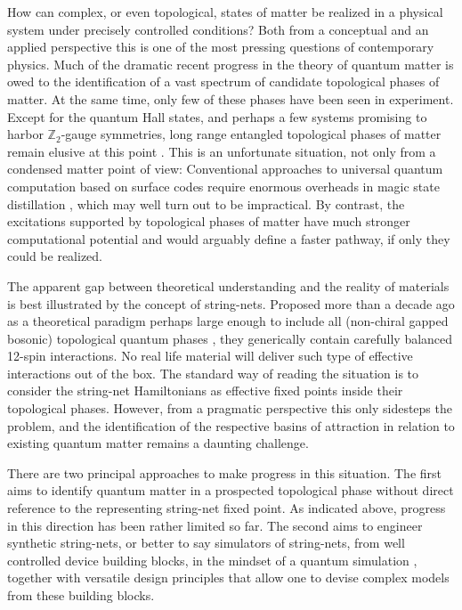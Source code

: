 \documentclass[twocolumn,floats,prx,showpacs]{revtex4-1}
\begin{document}
How can complex, or even topological, states of matter be realized in a physical system under precisely controlled conditions? Both from a conceptual and an applied perspective this is one of the most pressing questions of contemporary physics. Much of the dramatic recent progress in the  theory of quantum matter is owed to the identification of a vast spectrum of candidate topological phases of matter. At the same time, only few of these phases have been seen in experiment. Except for the quantum Hall states, and perhaps a few systems promising to harbor $\mathbb{Z}_2$-gauge symmetries, long range entangled topological phases of matter remain elusive at this point \cite{qc3,Wen2017}. This is an unfortunate situation, not only from a condensed matter point of view: Conventional approaches to universal quantum computation based on surface codes \cite{TopologicalQuantumMemory} require  enormous overheads in magic state distillation \cite{PhysRevA.71.022316}, which may well turn out to be impractical. By contrast, the excitations supported by topological phases of matter have much stronger computational potential \cite{Kitaev-AnnPhys-2003,qc3,RevModPhys.87.307} and would arguably define a faster pathway, if only they could be realized.   

The apparent gap between theoretical understanding and the reality of materials is best illustrated by the concept of string-nets. Proposed more than a decade ago as a theoretical paradigm perhaps large enough to include all (non-chiral gapped bosonic) topological quantum phases \cite{Levin2005,LevinWen,Wen2017}, they generically contain carefully balanced 12-spin interactions. No real life material will deliver such type of effective interactions out of the box. The standard way of reading the situation is to consider the string-net Hamiltonians as effective fixed points inside their topological phases. However, from a pragmatic perspective this only sidesteps the problem, and the identification of the respective basins of attraction in relation to existing quantum matter remains a daunting challenge. 

There are two principal approaches to make progress in this situation. The first aims to identify quantum matter in a prospected topological phase without direct reference to the representing string-net fixed point. As indicated above, progress in this direction has been rather limited so far. The second aims to engineer synthetic string-nets, or better to say simulators of string-nets, from well controlled device building blocks, in the
mindset of a quantum simulation \cite{CiracZollerSimulation,Roadmap}, 
together with versatile design principles that allow one to devise complex models from these building blocks.  
\end{document}
